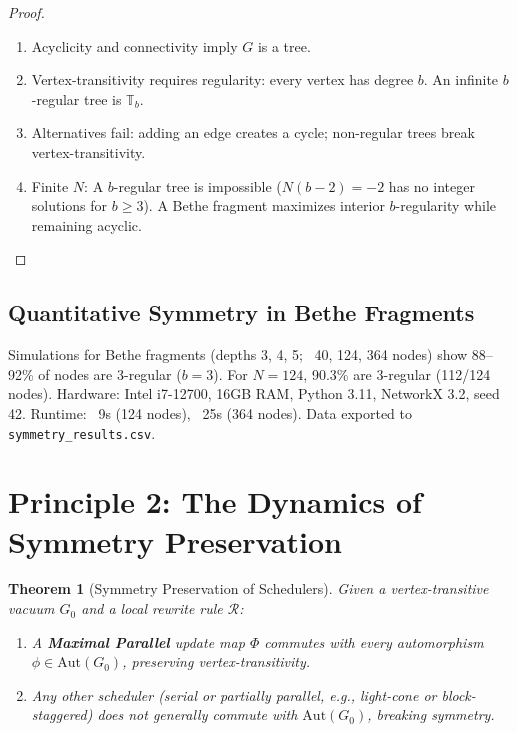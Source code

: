 \documentclass[11pt, a4paper]{article}
\newtheorem{theorem}{Theorem}[section]
\begin{document}
\begin{proof}
\begin{enumerate}
  \item Acyclicity and connectivity imply $G$ is a tree.
  \item Vertex-transitivity requires regularity: every vertex has degree $b$. An infinite $b$-regular tree is $\mathbb{T}_b$.
  \item Alternatives fail: adding an edge creates a cycle; non-regular trees break vertex-transitivity.
  \item Finite $N$: A $b$-regular tree is impossible ($N(b-2) = -2$ has no integer solutions for $b \geq 3$). A Bethe fragment maximizes interior $b$-regularity while remaining acyclic.
\end{enumerate}
\end{proof}

\subsection{Quantitative Symmetry in Bethe Fragments}
Simulations for Bethe fragments (depths 3, 4, 5; ~40, 124, 364 nodes) show 88–92\% of nodes are 3-regular ($b=3$). For $N=124$, 90.3\% are 3-regular (112/124 nodes). Hardware: Intel i7-12700, 16GB RAM, Python 3.11, NetworkX 3.2, seed 42. Runtime: ~9s (124 nodes), ~25s (364 nodes). Data exported to \texttt{symmetry\_results.csv}.

\section{Principle 2: The Dynamics of Symmetry Preservation}

\begin{theorem}[Symmetry Preservation of Schedulers]
\label{thm:scheduler_symmetry}
Given a vertex-transitive vacuum $G_0$ and a local rewrite rule $\mathcal{R}$:
\begin{enumerate}
  \item A \textbf{Maximal Parallel} update map $\Phi$ commutes with every automorphism $\phi \in \mathrm{Aut}(G_0)$, preserving vertex-transitivity.
  \item Any other scheduler (serial or partially parallel, e.g., light-cone or block-staggered) does not generally commute with $\mathrm{Aut}(G_0)$, breaking symmetry.
\end{enumerate}
\end{theorem}
\end{document}
